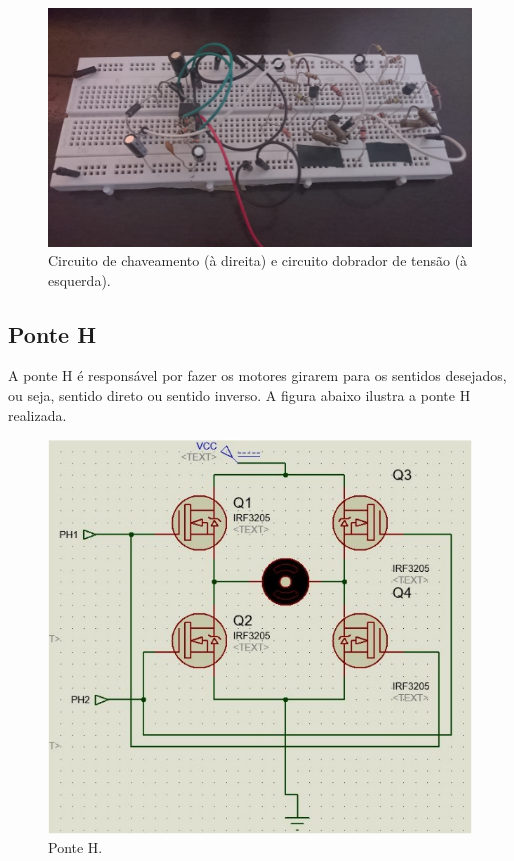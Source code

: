 \begin{figure}[h!]
  \centering
  \includegraphics[width=1.0\textwidth]{figuras/TesteChaveamento.JPG}
  \caption{Circuito de chaveamento (à direita) e circuito dobrador de tensão (à esquerda).}
\end{figure}

\subsection{Ponte H}

A ponte H é responsável por fazer os motores girarem para os sentidos desejados, ou seja, sentido direto ou sentido inverso. A figura abaixo ilustra a ponte H realizada.

\begin{figure}[h!]
  \centering
    \includegraphics[scale=0.5]{figuras/Ponte_H.jpg}
  \caption{Ponte H.}
\end{figure}

